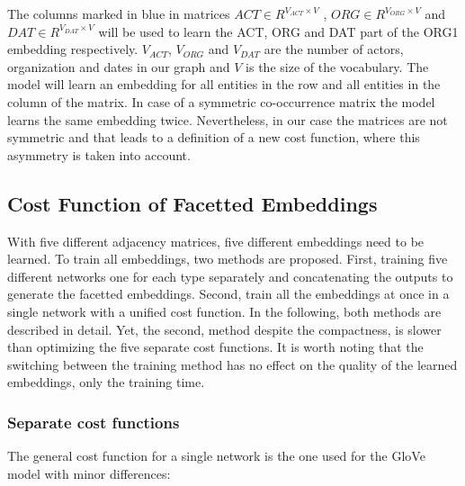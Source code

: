 The columns marked in blue in matrices $ACT\in R^{V_{ACT}\times V}$ , $ORG\in R^{V_{ORG}\times V}$  and $DAT\in R^{V_{DAT}\times V}$ will be used to learn the ACT, ORG and DAT part of the ORG1 embedding respectively. $V_{ACT}$, $V_{ORG}$ and $V_{DAT}$ are the number of actors, organization and dates in our graph and $V$ is the size of the vocabulary. The model will learn an embedding for all entities in the row and all entities in the column of the matrix. In case of a symmetric co-occurrence matrix the model learns the same embedding twice. Nevertheless, in our case the matrices are not symmetric and that leads to a definition of a new cost function, where this asymmetry is taken into account.  
\subsection{Cost Function of Facetted Embeddings}
\label{sec:facetted_embeddings}

With five different adjacency matrices, five different embeddings need to be learned. To train all embeddings, two methods are proposed. First, training five different networks one for each type separately and concatenating the outputs to generate the facetted embeddings. Second, train all the embeddings at once in a single network with a unified cost function. In the following, both methods are described in detail. Yet, the second, method despite the compactness, is slower than optimizing the five separate cost functions. It is worth noting that the switching between the training method has no effect on the quality of the learned embeddings, only the training time.\\
\subsubsection{Separate cost functions}
\label{sec:normal_cost}

The general cost function for a single network is the one used for the GloVe model with minor differences: 

